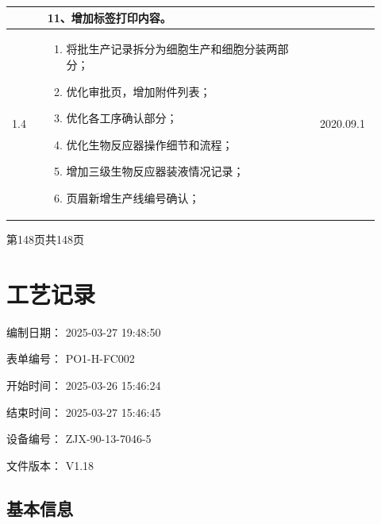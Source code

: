 \documentclass[UTF8,10pt,a4paper,fontset=fandol]{ctexart}
\newcommand{\fieldvalue}[1]{#1}
\newcommand{\handwritten}[1]{#1}
\begin{document}
\noindent
\begin{tabular}{|p{0.09\linewidth}|p{0.69\linewidth}|p{0.14\linewidth}|}
\hline
&
11、增加标签打印内容。
&\\
\hline
\fieldvalue{1.4}
&
\begin{enumerate}
\item 将批生产记录拆分为细胞生产和细胞分装两部分；
\item 优化审批页，增加附件列表；
\item 优化各工序确认部分；
\item 优化生物反应器操作细节和流程；
\item 增加三级生物反应器装液情况记录；
\item 页眉新增生产线编号确认；
\end{enumerate}
&
\fieldvalue{\handwritten{2020.09.1}}
\\
\hline
\end{tabular}

\vfill

\begin{center}
第148页\quad 共148页
\end{center}

\newpage

\section*{工艺记录}

编制日期：
\fieldvalue{2025-03-27 19:48:50}

表单编号：
\fieldvalue{PO1-H-FC002}

开始时间：
\fieldvalue{2025-03-26 15:46:24}

结束时间：
\fieldvalue{2025-03-27 15:46:45}

设备编号：
\fieldvalue{ZJX-90-13-7046-5}

文件版本：
\fieldvalue{V1.18}

\subsection*{基本信息}
\end{document}
